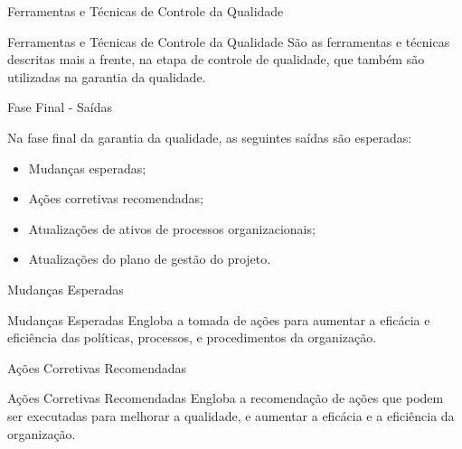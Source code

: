 \documentclass[xcolor=x11names,compress]{beamer}
\begin{document}
\begin{frame}{Ferramentas e Técnicas de Controle da Qualidade}

\begin{alertblock}{Ferramentas e Técnicas de Controle da Qualidade}
São as ferramentas e técnicas descritas mais a frente, na etapa de controle de qualidade, que também são utilizadas na garantia da qualidade.
\end{alertblock}

\end{frame}

\begin{frame}{Fase Final - Saídas}

Na fase final da garantia da qualidade, as seguintes saídas são esperadas:

\begin{itemize}
\itemsep 5mm

\item Mudanças esperadas;

\item Ações corretivas recomendadas;

\item Atualizações de ativos de processos organizacionais;

\item Atualizações do plano de gestão do projeto.

\end{itemize}

\end{frame}

\begin{frame}{Mudanças Esperadas}

\begin{alertblock}{Mudanças Esperadas}
Engloba a tomada de ações para aumentar a eficácia e eficiência das políticas, processos, e procedimentos da organização.
\end{alertblock}

\end{frame}

\begin{frame}{Ações Corretivas Recomendadas}

\begin{alertblock}{Ações Corretivas Recomendadas}
Engloba a recomendação de ações que podem ser executadas para melhorar a qualidade, e aumentar a eficácia e a eficiência da organização.
\end{alertblock}

\end{frame}
\end{document}
